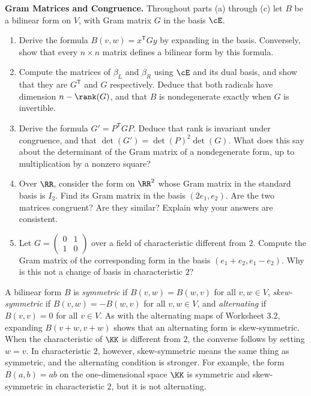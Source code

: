 \documentclass[12pt,reqno]{amsart}
\begin{document}
\begin{problems}
\item\label{b:gram} \textbf{Gram Matrices and Congruence.} Throughout parts (a) through (c) let $B$ be a bilinear form on $V$, with Gram matrix $G$ in the basis $\cE$.
\begin{enumerate}
\item Derive the formula $B(v,w)=x^{\mathsf T}Gy$ by expanding in the basis. Conversely, show that every $n\times n$ matrix defines a bilinear form by this formula.
\item Compute the matrices of $\beta_L$ and $\beta_R$ using $\cE$ and its dual basis, and show that they are $G^{\mathsf T}$ and $G$ respectively. Deduce that both radicals have dimension $n-\rank(G)$, and that $B$ is nondegenerate exactly when $G$ is invertible.
\item Derive the formula $G'=P^{\mathsf T}GP$. Deduce that rank is invariant under congruence, and that $\det(G')=\det(P)^2\det(G)$. What does this say about the determinant of the Gram matrix of a nondegenerate form, up to multiplication by a nonzero square?
\item Over $\RR$, consider the form on $\RR^2$ whose Gram matrix in the standard basis is $I_2$. Find its Gram matrix in the basis $(2e_1,e_2)$. Are the two matrices congruent? Are they similar? Explain why your answers are consistent.
\item Let $G=\left(\begin{smallmatrix}0&1\\1&0\end{smallmatrix}\right)$ over a field of characteristic different from $2$. Compute the Gram matrix of the corresponding form in the basis $(e_1+e_2,e_1-e_2)$. Why is this not a change of basis in characteristic $2$?
\end{enumerate}
\end{problems}

\hrulefill

A bilinear form $B$ is \emph{symmetric} if $B(v,w)=B(w,v)$ for all $v,w\in V$, \emph{skew-symmetric} if $B(v,w)=-B(w,v)$ for all $v,w\in V$, and \emph{alternating} if $B(v,v)=0$ for all $v\in V$. As with the alternating maps of Worksheet 3.2, expanding $B(v+w,v+w)$ shows that an alternating form is skew-symmetric. When the characteristic of $\KK$ is different from $2$, the converse follows by setting $w=v$. In characteristic $2$, however, skew-symmetric means the same thing as symmetric, and the alternating condition is stronger. For example, the form $B(a,b)=ab$ on the one-dimensional space $\KK$ is symmetric and skew-symmetric in characteristic $2$, but it is not alternating.
\end{document}
